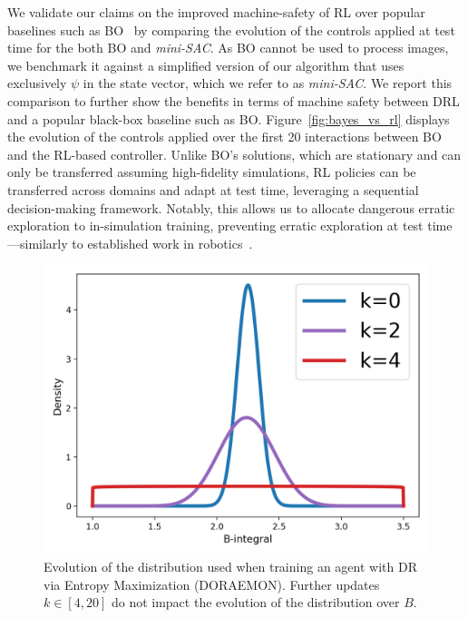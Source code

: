 We validate our claims on the improved machine-safety of RL over popular baselines such as BO~\citep{shalloo2020automation} by comparing the evolution of the controls applied at test time for the both BO and \emph{mini-SAC}. As BO cannot be used to process images, we benchmark it against a simplified version of our algorithm that uses exclusively \( \psi \) in the state vector, which we refer to as \emph{mini-SAC}. We report this comparison to further show the benefits in terms of machine safety between DRL and a popular black-box baseline such as BO.
Figure~\ref{fig:bayes_vs_rl} displays the evolution of the controls applied over the first 20 interactions between BO and the RL-based controller. Unlike BO's solutions, which are stationary and can only be transferred assuming high-fidelity simulations, RL policies can be transferred across domains and adapt at test time, leveraging a sequential decision-making framework.
Notably, this allows us to allocate dangerous erratic exploration to in-simulation training, preventing erratic exploration at test time---similarly to established work in robotics~\citep{kober2013reinforcement}. 

\begin{figure}
    \centering
    \includegraphics[width=0.99\linewidth]{images/doraemon_distributions_3in1.png}
    \caption{Evolution of the distribution used when training an agent with DR via Entropy Maximization (DORAEMON). Further updates \( k \in [4,20] \) do not impact the evolution of the distribution over \( B \).}
    \label{fig:DORAEMON_distrs_over_training}
\end{figure}


